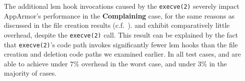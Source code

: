 The additional \gls{lsm} hook invocations caused by the \texttt{execve(2)} severely impact
AppArmor's performance in the \textbf{Complaining} case, for the same reasons as discussed
in the file creation results (c.f.~). \bpfbox{} and \bpfcontain{}
exhibit comparatively little overhead, despite the \texttt{execve(2)} call. This result
can be explained by the fact that \texttt{execve(2)}'s code path invokes significantly
fewer \gls{lsm} hooks than the file creation and deletion code paths we examined earlier.
In all test cases, \bpfbox{} and \bpfcontain{} are able to achieve under $7\%$ overhead in
the worst case, and under $3\%$ in the majority of cases.




